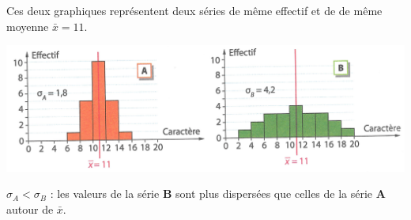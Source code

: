 \begin{myex}
	Ces deux graphiques représentent deux séries de même effectif et de de même moyenne $\bar{x} = 11$.
	
	\includegraphics[scale=0.9, angle=-1.1, origin=c]{img/ex_ecart_type}
	
	$\sigma _A < \sigma _B$ : les valeurs de la série $\mathbf{B}$ sont plus dispersées que celles de la série $\mathbf{A}$ autour de $\bar{x}$. 
\end{myex}